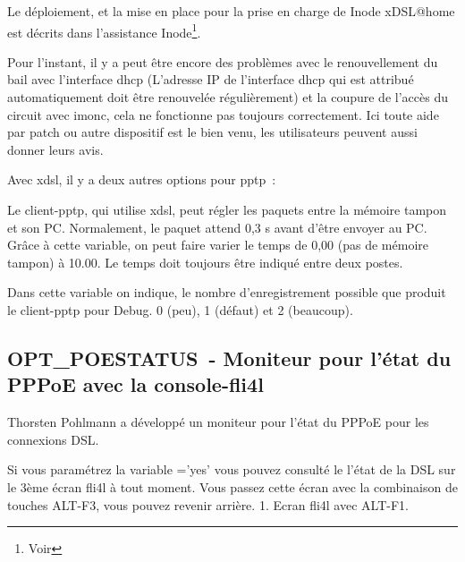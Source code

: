Le déploiement, et la mise en place pour la prise en charge de Inode xDSL@home
est décrits dans l'assistance Inode\footnote{Voir
}.

Pour l'instant, il y a peut être encore des problèmes avec le renouvellement
du bail avec l'interface dhcp (L'adresse IP de l'interface dhcp qui est attribué
automatiquement doit être renouvelée régulièrement) et la coupure de l'accès du circuit avec
imonc, cela ne fonctionne pas toujours correctement. Ici toute aide par patch
ou autre dispositif est le bien venu, les utilisateurs peuvent aussi donner
leurs avis.

Avec xdsl, il y a deux autres options pour pptp~:

\begin{description}

Le client-pptp, qui utilise xdsl, peut régler les paquets entre la mémoire
tampon et son PC. Normalement, le paquet attend 0,3 s avant d'être envoyer
au PC. Grâce à cette variable, on peut faire varier le temps de 0,00
(pas de mémoire tampon) à 10.00. Le temps doit toujours être indiqué
entre deux postes.


Dans cette variable on indique, le nombre d'enregistrement possible
que produit le client-pptp pour Debug. 0 (peu), 1 (défaut) et 2 (beaucoup).

\end{description}

\subsection {OPT\_POESTATUS~- Moniteur pour l'état du PPPoE avec la console-fli4l}

    Thorsten Pohlmann a développé un moniteur pour l'état du PPPoE pour
    les connexions DSL.

    Si vous paramétrez la variable ='yes' vous pouvez
    consulté le l'état de la DSL sur le 3ème écran fli4l à tout moment. Vous
    passez cette écran avec la combinaison de touches ALT-F3, vous pouvez
    revenir arrière.
    1. Ecran fli4l avec ALT-F1.

